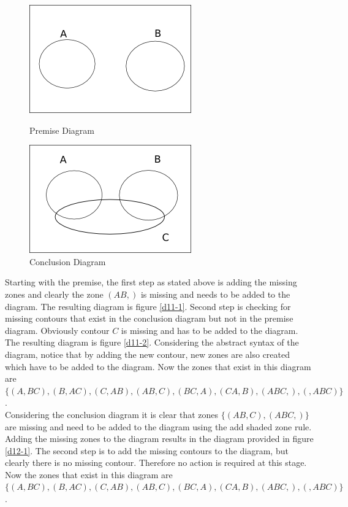 \documentclass[10pt, a4paper, titlepage]{article}
\begin{document}
\begin{figure}[h]
\begin{minipage}[h]{0.5\linewidth}
\centering
\includegraphics[scale=0.5]{images/d11.png}
\caption{Premise Diagram}
\label{d11}
\end{minipage}
\hspace{0.5cm}
\begin{minipage}[h]{0.5\linewidth}
\centering
\includegraphics[scale=0.5]{images/d12.png}
\caption{Conclusion Diagram}
\label{d12}
\end{minipage}
\end{figure}

Starting with the premise, the first step as stated above is adding the missing zones and clearly the zone $ (AB , ) $ is missing and needs to be added to the diagram. The resulting diagram is figure \ref{d11-1}. Second step is checking for missing contours that exist in the conclusion diagram but not in the premise diagram. Obviously contour $ C $ is missing and has to be added to the diagram. The resulting diagram is figure \ref{d11-2}. Considering the abstract syntax of the diagram, notice that by adding the new contour, new zones are also created which have to be added to the diagram. Now the zones that exist in this diagram are $ \lbrace (A, BC), (B, AC), (C, AB), (AB, C), (BC, A), (CA, B), (ABC, ), ( , ABC)  \rbrace $.\\
 
Considering the conclusion diagram it is clear that zones $ \lbrace (AB, C), (ABC, ) \rbrace $ are missing and need to be added to the diagram using the add shaded zone rule. Adding the missing zones to the diagram results in the diagram provided in figure \ref{d12-1}. The second step is to add the missing contours to the diagram, but clearly there is no missing contour. Therefore no action is required at this stage. Now the zones that exist in this diagram are $ \lbrace (A, BC), (B, AC), (C, AB), (AB, C), (BC, A), (CA, B), (ABC, ), ( , ABC)  \rbrace $.\\ \\
\end{document}
